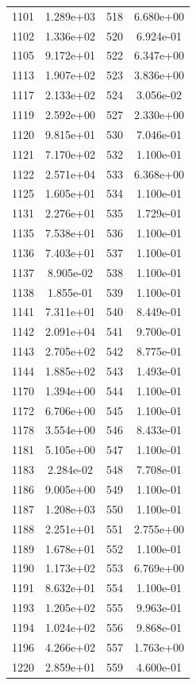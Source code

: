 \documentclass[12pt]{article}
\begin{document}
\begin{longtable}{@{}cccc@{}}
1101 & 1.289e+03 & 518 & 6.680e+00 \\
1102 & 1.336e+02 & 520 & 6.924e-01 \\
1105 & 9.172e+01 & 522 & 6.347e+00 \\
1113 & 1.907e+02 & 523 & 3.836e+00 \\
1117 & 2.133e+02 & 524 & 3.056e-02 \\
1119 & 2.592e+00 & 527 & 2.330e+00 \\
1120 & 9.815e+01 & 530 & 7.046e-01 \\
1121 & 7.170e+02 & 532 & 1.100e-01 \\
1122 & 2.571e+04 & 533 & 6.368e+00 \\
1125 & 1.605e+01 & 534 & 1.100e-01 \\
1131 & 2.276e+01 & 535 & 1.729e-01 \\
1135 & 7.538e+01 & 536 & 1.100e-01 \\
1136 & 7.403e+01 & 537 & 1.100e-01 \\
1137 & 8.905e-02 & 538 & 1.100e-01 \\
1138 & 1.855e-01 & 539 & 1.100e-01 \\
1141 & 7.311e+01 & 540 & 8.449e-01 \\
1142 & 2.091e+04 & 541 & 9.700e-01 \\
1143 & 2.705e+02 & 542 & 8.775e-01 \\
1144 & 1.885e+02 & 543 & 1.493e-01 \\
1170 & 1.394e+00 & 544 & 1.100e-01 \\
1172 & 6.706e+00 & 545 & 1.100e-01 \\
1178 & 3.554e+00 & 546 & 8.433e-01 \\
1181 & 5.105e+00 & 547 & 1.100e-01 \\
1183 & 2.284e-02 & 548 & 7.708e-01 \\
1186 & 9.005e+00 & 549 & 1.100e-01 \\
1187 & 1.208e+03 & 550 & 1.100e-01 \\
1188 & 2.251e+01 & 551 & 2.755e+00 \\
1189 & 1.678e+01 & 552 & 1.100e-01 \\
1190 & 1.173e+02 & 553 & 6.769e+00 \\
1191 & 8.632e+01 & 554 & 1.100e-01 \\
1193 & 1.205e+02 & 555 & 9.963e-01 \\
1194 & 1.024e+02 & 556 & 9.868e-01 \\
1196 & 4.266e+02 & 557 & 1.763e+00 \\
1220 & 2.859e+01 & 559 & 4.600e-01 \\

\end{longtable}
\end{document}
